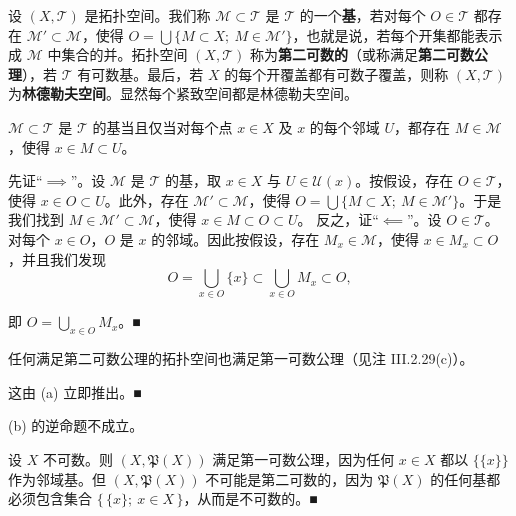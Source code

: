 设 $ (X, \mathcal{T}) $ 是拓扑空间。我们称 $ \mathcal{M} \subset \mathcal{T} $ 是 $ \mathcal{T} $ 的一个\textbf{基}，若对每个 $ O \in \mathcal{T} $ 都存在 $ \mathcal{M}' \subset \mathcal{M} $，使得 $ O = \bigcup \{ M \subset X ;\ M \in \mathcal{M}' \} $，也就是说，若每个开集都能表示成 $ \mathcal{M} $ 中集合的并。拓扑空间 $ (X, \mathcal{T}) $ 称为\textbf{第二可数的}（或称满足\textbf{第二可数公理}），若 $ \mathcal{T} $ 有可数基。最后，若 $ X $ 的每个开覆盖都有可数子覆盖，则称 $ (X, \mathcal{T}) $ 为\textbf{林德勒夫空间}。显然每个紧致空间都是林德勒夫空间。

\begin{remark}

\begin{items}
\item

$ \mathcal{M} \subset \mathcal{T} $ 是 $ \mathcal{T} $ 的基当且仅当对每个点 $ x \in X $ 及 $ x $ 的每个邻域 $ U $，都存在 $ M \in \mathcal{M} $，使得 $ x \in M \subset U $。

\proofhead
先证“$ \implies $”。设 $ \mathcal{M} $ 是 $ \mathcal{T} $ 的基，取 $ x \in X $ 与 $ U \in \mathcal{U}(x) $。按假设，存在 $ O \in \mathcal{T} $，使得 $ x \in O \subset U $。此外，存在 $ \mathcal{M}' \subset \mathcal{M} $，使得 $ O = \bigcup \{ M \subset X ;\ M \in \mathcal{M}' \} $。于是我们找到 $ M \in \mathcal{M}' \subset \mathcal{M} $，使得 $ x \in M \subset O \subset U $。
反之，证“$ \impliedby $”。设 $ O \in \mathcal{T} $。对每个 $ x \in O $，$ O $ 是 $ x $ 的邻域。因此按假设，存在 $ M_{x} \in \mathcal{M} $，使得 $ x \in M_{x} \subset O $，并且我们发现
\[
O = \bigcup_{x \in O} \{x\} \subset \bigcup_{x \in O} M_{x} \subset O ,
\]

即 $ O = \bigcup_{x \in O} M_{x} $。\nobreak\hspace{0.35em}■

\item

任何满足第二可数公理的拓扑空间也满足第一可数公理（见注 III.2.29(c)）。

\proofhead
这由 (a) 立即推出。\nobreak\hspace{0.35em}■
\item

(b) 的逆命题不成立。

\proofhead
设 $ X $ 不可数。则 $ (X, \mathfrak{P}(X)) $ 满足第一可数公理，因为任何 $ x \in X $ 都以 $ \{\{x\}\} $ 作为邻域基。但 $ (X, \mathfrak{P}(X)) $ 不可能是第二可数的，因为 $ \mathfrak{P}(X) $ 的任何基都必须包含集合 $ \{\, \{x\} ;\ x \in X \,\} $，从而是不可数的。\nobreak\hspace{0.35em}■
\end{items}

\end{remark}

